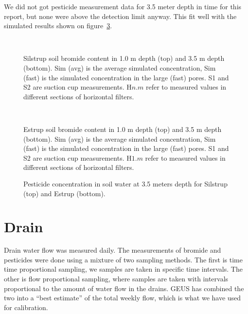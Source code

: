 We did not got pesticide measurement data for 3.5 meter depth in time
for this report, but none were above the detection limit anyway.  This
fit well with the simulated results shown on
figure~\ref{fig:pest-horizontal}.

\begin{figure}[htbp]
  \begin{center}
    \\
  \end{center}
  \caption{Silstrup soil bromide content in 1.0 m depth (top) and 3.5
    m depth (bottom).  Sim (avg) is the average simulated
    concentration, Sim (fast) is the simulated concentration in the
    large (fast) pores.  S1 and S2 are suction cup measurements.
    H$n$.$m$ refer to measured values in different sections of
    horizontal filters.}
  \label{fig:Silstrup-bromide}
\end{figure}

\begin{figure}[htbp]
  \begin{center}
    \\
  \end{center}
  \caption{Estrup soil bromide content in 1.0 m depth (top) and 3.5
    m depth (bottom).  Sim (avg) is the average simulated
    concentration, Sim (fast) is the simulated concentration in the
    large (fast) pores.  S1 and S2 are suction cup measurements.
    H$1$.$m$ refer to measured values in different sections of
    horizontal filters.}
  \label{fig:Estrup-bromide}
\end{figure}

\begin{figure}[htbp]
  \begin{center}
  \end{center}
  \caption{Pesticide concentration in soil water at 3.5 meters depth
    for Silstrup (top) and Estrup (bottom).}
  \label{fig:pest-horizontal}
\end{figure}

\FloatBarrier
\section{Drain}

Drain water flow was measured daily.  The measurements of bromide and
pesticides were done using a mixture of two sampling methods.  The
first is time time proportional sampling, we samples are taken in
specific time intervals.  The other is flow proportional sampling,
where samples are taken with intervals proportional to the amount of
water flow in the drains.  GEUS has combined the two into a ``best
estimate'' of the total weekly flow, which is what we have used for
calibration.

